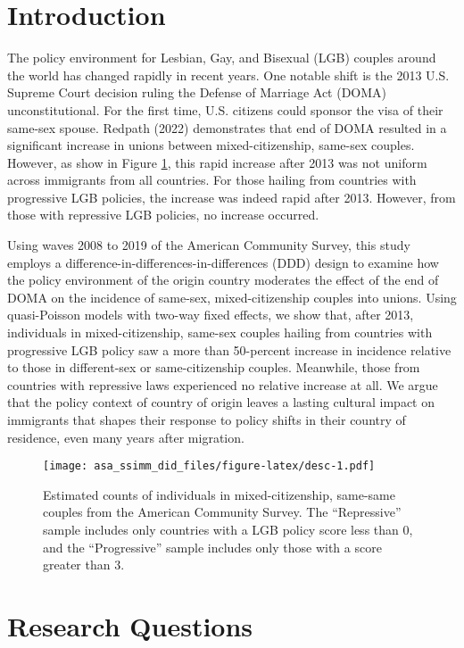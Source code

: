 \documentclass[
  11pt,
]{article}
\author{}
\date{\vspace{-2.5em}}
\begin{document}
\hypertarget{introduction}{%
\section{Introduction}\label{introduction}}

The policy environment for Lesbian, Gay, and Bisexual (LGB) couples around the world has changed rapidly in recent years. One notable shift is the 2013 U.S. Supreme Court decision ruling the Defense of Marriage Act (DOMA) unconstitutional. For the first time, U.S. citizens could sponsor the visa of their same-sex spouse. Redpath (2022) demonstrates that end of DOMA resulted in a significant increase in unions between mixed-citizenship, same-sex couples. However, as show in Figure \ref{fig:desc}, this rapid increase after 2013 was not uniform across immigrants from all countries. For those hailing from countries with progressive LGB policies, the increase was indeed rapid after 2013. However, from those with repressive LGB policies, no increase occurred.

Using waves 2008 to 2019 of the American Community Survey, this study employs a difference-in-differences-in-differences (DDD) design to examine how the policy environment of the origin country moderates the effect of the end of DOMA on the incidence of same-sex, mixed-citizenship couples into unions. Using quasi-Poisson models with two-way fixed effects, we show that, after 2013, individuals in mixed-citizenship, same-sex couples hailing from countries with progressive LGB policy saw a more than 50-percent increase in incidence relative to those in different-sex or same-citizenship couples. Meanwhile, those from countries with repressive laws experienced no relative increase at all. We argue that the policy context of country of origin leaves a lasting cultural impact on immigrants that shapes their response to policy shifts in their country of residence, even many years after migration.

\begin{figure}
\centering
\texttt{[image: asa\_ssimm\_did\_files/figure-latex/desc-1.pdf]}
\caption{\label{fig:desc}Estimated counts of individuals in mixed-citizenship, same-same couples from the American Community Survey. The ``Repressive'' sample includes only countries with a LGB policy score less than 0, and the ``Progressive'' sample includes only those with a score greater than 3.}
\end{figure}

\hypertarget{research-questions}{%
\section{Research Questions}\label{research-questions}}
\end{document}
